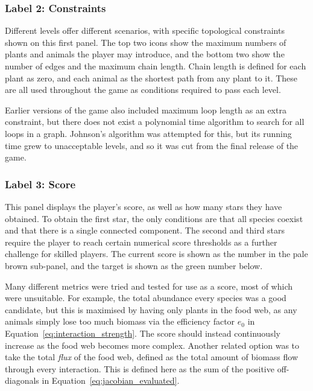 \subsubsection{Label 2: Constraints}
Different levels offer different scenarios, with specific topological constraints shown on this first panel. The top two icons show the maximum numbers of plants and animals the player may introduce, and the bottom two show the number of edges and the maximum chain length. Chain length is defined for each plant as zero, and each animal as the shortest path from any plant to it. These are all used throughout the game as conditions required to pass each level.

Earlier versions of the game also included maximum loop length as an extra constraint, but there does not exist a polynomial time algorithm to search for all loops in a graph. Johnson's algorithm \citep{Johnson1975} was attempted for this, but its running time grew to unacceptable levels, and so it was cut from the final release of the game.

\subsubsection{Label 3: Score}
This panel displays the player's score, as well as how many stars they have obtained. To obtain the first star, the only conditions are that all species coexist and that there is a single connected component. The second and third stars require the player to reach certain numerical score thresholds as a further challenge for skilled players. The current score is shown as the number in the pale brown sub-panel, and the target is shown as the green number below.

Many different metrics were tried and tested for use as a score, most of which were unsuitable. For example, the total abundance every species was a good candidate, but this is maximised by having only plants in the food web, as any animals simply lose too much biomass via the efficiency factor $e_0$ in Equation~\eqref{eq:interaction_strength}. The score should instead continuously increase as the food web becomes more complex. Another related option was to take the total \emph{flux} of the food web, defined as the total amount of biomass flow through every interaction. This is defined here as the sum of the positive off-diagonals in Equation~\eqref{eq:jacobian_evaluated}.

